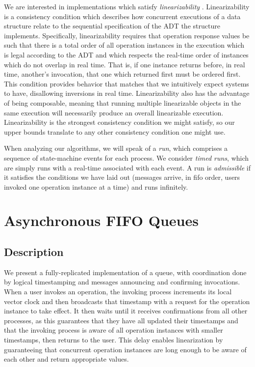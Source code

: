 \documentclass[a4paper,anonymous,USenglish]{lipics-v2021}
\theoremstyle{definition}
\begin{document}
We are interested in implementations which satisfy \emph{linearizability} \cite{HerlihyWing90}.  Linearizability is a consistency condition which describes how concurrent executions of a data structure relate to the sequential specification of the ADT the structure implements.  Specifically, linearizability requires that operation response values be such that there is a total order of all operation instances in the execution which is legal according to the ADT and which respects the real-time order of instances which do not overlap in real time.  That is, if one instance returns before, in real time, another's invocation, that one which returned first must be ordered first.  This condition provides behavior that matches that we intuitively expect systems to have, disallowing inversions in real time.  Linearizability also has the advantage of being composable, meaning that running multiple linearizable objects in the same execution will necessarily produce an overall linearizable execution.  Linearizability is the strongest consistency condition we might satisfy, so our upper bounds translate to any other consistency condition one might use.

When analyzing our algorithms, we will speak of a \emph{run}, which comprises a sequence of state-machine events for each process.  We consider \emph{timed runs}, which are simply runs with a real-time associated with each event.  A run is \emph{admissible} if it satisfies the conditions we have laid out (messages arrive, in fifo order, users invoked one operation instance at a time) and runs infinitely.

\section{Asynchronous FIFO Queues}

\subsection{Description}

We present a fully-replicated implementation of a queue, with coordination done by logical timestamping and messages announcing and confirming invocations.  When a user invokes an operation, the invoking process increments its local vector clock and then broadcasts that timestamp with a request for the operation instance to take effect.  It then waits until it receives confirmations from all other processes, as this guarantees that they have all updated their timestamps and that the invoking process is aware of all operation instances with smaller timestamps, then returns to the user.  This delay enables linearization by guaranteeing that concurrent operation instances are long enough to be aware of each other and return appropriate values.
\end{document}
